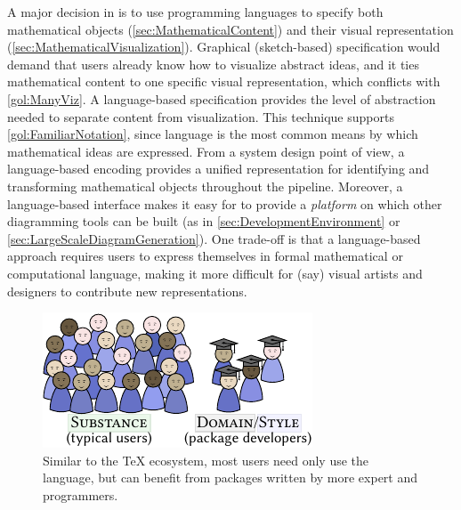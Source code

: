 A major decision in \Penrose{} is to use programming languages to specify both mathematical objects (\cref{sec:MathematicalContent}) and their visual representation (\cref{sec:MathematicalVisualization}).  Graphical (\eg sketch-based) specification would demand that users already know how to visualize abstract ideas, and it ties mathematical content to one specific visual representation, which conflicts with \ref{gol:ManyViz}.  A language-based specification provides the level of abstraction needed to separate content from visualization. This technique supports \ref{gol:FamiliarNotation}, since language is the most common means by which mathematical ideas are expressed.  From a system design point of view, a language-based encoding provides a unified representation for identifying and transforming mathematical objects throughout the pipeline.  Moreover, a language-based interface makes it easy for \Penrose{} to provide a \emph{platform} on which other diagramming tools can be built (as in \cref{sec:DevelopmentEnvironment} or \cref{sec:LargeScaleDiagramGeneration}).  One trade-off is that a language-based approach requires users to express themselves in formal mathematical or computational language, making it more difficult for (say) visual artists and designers to contribute new representations.

\begin{figure}[b]\vspace{-\baselineskip}
  \begin{minipage}[c]{.35\linewidth}
    \caption{Similar to the \TeX{} ecosystem, most users need only use the \Substance{} language, but can benefit from packages written by more expert \Domain{} and \Style{} programmers.\label{fig:NoviceExpertUsers}}
  \end{minipage}\hfill
  \begin{minipage}[c]{.55\linewidth}
     \includegraphics[scale=1.5]{assets/penrose/NoviceExpertUsers.pdf}
  \end{minipage}\hfill
\end{figure}


